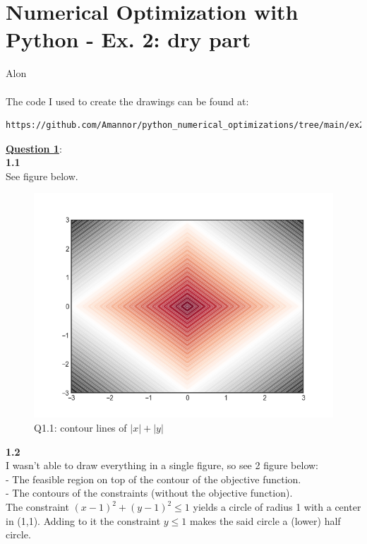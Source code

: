 \documentclass[fleqn]{article}
\begin{document}
\newcommand\tab[1][1cm]{\hspace*{#1}}
\section*{Numerical Optimization with Python -  Ex. 2: dry part}
Alon\\ \\

The code I used to create the drawings can be found at:\\

\begin{lstlisting}[breaklines]
https://github.com/Amannor/python_numerical_optimizations/tree/main/ex2/dry_part
\end{lstlisting}

\underline{\textbf{Question 1}}:\\

\textbf{1.1} \\
See figure below. \\

\begin{figure}[h!]
\includegraphics[width=0.8\linewidth]{q1_1.PNG}
\caption{Q1.1: contour lines of $\lvert x\rvert +\lvert y \rvert$}
\end{figure}

\textbf{1.2} \\
I wasn't able to draw everything in a single figure, so see 2 figure below:\\
- The feasible region on top of the contour of the objective function. \\
- The contours of the constraints (without the objective function). \\

The constraint $(x-1)^2+(y-1)^2 \leq 1$ yields a circle of radius 1 with a center in (1,1). Adding to it the constraint $y \leq 1$ makes the said circle a (lower) half circle.\\
\end{document}
